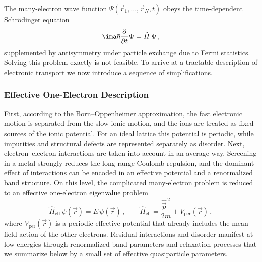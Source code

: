         The many-electron wave function $\Psi(\vec{r}_1,\dots,\vec{r}_N,t)$ obeys the time-dependent Schrödinger equation
        \begin{equation}
            \ima\hbar \frac{\partial}{\partial t} \Psi
            = \hat{H}\,\Psi\,,
            \label{eq:micro:schroedinger}
        \end{equation}
        supplemented by antisymmetry under particle exchange due to Fermi statistics. Solving this problem exactly is not feasible. To arrive at a tractable description of electronic transport we now introduce a sequence of simplifications. \cite{ashcroft_solid_2012, gross_festkorperphysik_2014}

        \subsubsection*{Effective One-Electron Description}

            First, according to the Born--Oppenheimer approximation, the fast electronic motion is separated from the slow ionic motion, and the ions are treated as fixed sources of the ionic potential. For an ideal lattice this potential is periodic, while impurities and structural defects are represented separately as disorder. Next, electron--electron interactions are taken into account in an average way. Screening in a metal strongly reduces the long-range Coulomb repulsion, and the dominant effect of interactions can be encoded in an effective potential and a renormalized band structure.
            On this level, the complicated many-electron problem is reduced to an effective one-electron eigenvalue problem
            \begin{equation}
                \hat{H}_\text{eff}\,\psi(\vec{r})
                = E\,\psi(\vec{r})\,,
                \qquad
                \hat{H}_\text{eff}
                = \frac{\hat{\vec{p}}^{\,2}}{2m} + V_\text{per}(\vec{r})\,,
                \label{eq:micro:heff}
            \end{equation}
            where $V_\text{per}(\vec{r})$ is a periodic effective potential that already includes the mean-field action of the other electrons. 
            Residual interactions and disorder manifest at low energies through renormalized band parameters and relaxation processes that we summarize below by a small set of effective quasiparticle parameters.

